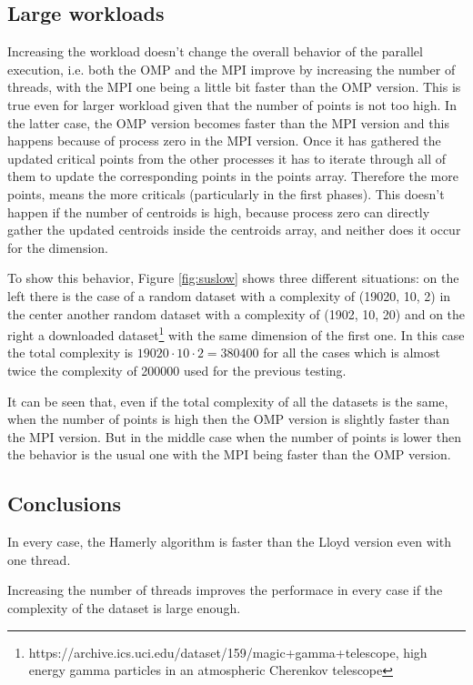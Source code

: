 \documentclass[conference]{IEEEtran}
\begin{document}
\subsection{Large workloads}
Increasing the workload doesn't change the overall behavior of the parallel execution, i.e. both the OMP and the MPI improve by increasing the number of threads, with the MPI one being a little bit faster than the OMP version. This is true even for larger workload given that the number of points is not too high. In the latter case, the OMP version becomes faster than the MPI version and this happens because of process zero in the MPI version. 
Once it has gathered the updated critical points from the other processes it has to iterate through all of them to update the corresponding points in the points array. Therefore the more points, means the more criticals (particularly in the first phases). This doesn't happen if the number of centroids is high, because process zero can directly gather the updated centroids inside the centroids array, and neither does it occur for the dimension.

To show this behavior, Figure \ref{fig:suslow} shows three different situations: on the left there is the case of a random dataset with a complexity of (19020, 10, 2) in the center another random dataset with a complexity of (1902, 10, 20) and on the right a downloaded dataset\footnote{https://archive.ics.uci.edu/dataset/159/magic+gamma+telescope, high energy gamma particles in an atmospheric Cherenkov telescope} with the same dimension of the first one. In this case the total complexity is $19020\cdot 10\cdot 2 = 380400$ for all the cases which is almost twice the complexity of 200000 used for the previous testing.

It can be seen that, even if the total complexity of all the datasets is the same, when the number of points is high then the OMP version is slightly faster than the MPI version. But in the middle case when the number of points is lower then the behavior is the usual one with the MPI being faster than the OMP version.

\subsection{Conclusions}
In every case, the Hamerly algorithm is faster than the Lloyd version even with one thread. 

Increasing the number of threads improves the performace in every case if the complexity of the dataset is large enough.
\end{document}
